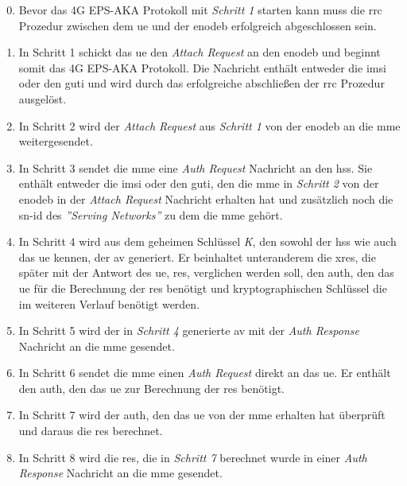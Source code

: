 \begin{enumerate}
\setcounter{enumi}{-1}
\item Bevor das 4G EPS-AKA Protokoll mit \textit{Schritt 1} starten kann muss die \gls{rrc} Prozedur zwischen dem \gls{ue} und der \gls{enodeb} erfolgreich abgeschlossen sein.

\item In Schritt 1 schickt das \gls{ue} den \textit{Attach Request} an den \gls{enodeb} und beginnt somit das 4G EPS-AKA Protokoll.
Die Nachricht enthält entweder die \gls{imsi} oder den \gls{guti} und wird durch das erfolgreiche abschließen der \gls{rrc} Prozedur ausgelöst.

\item In Schritt 2 wird der \textit{Attach Request} aus \textit{Schritt 1} von der \gls{enodeb} an die \gls{mme} weitergesendet.

\item In Schritt 3 sendet die \gls{mme} eine \textit{Auth Request} Nachricht an den \gls{hss}.
Sie enthält entweder die \gls{imsi} oder den \gls{guti}, den die \gls{mme} in \textit{Schritt 2} von der \gls{enodeb} in der \textit{Attach Request} Nachricht erhalten hat und zusätzlich noch die \gls{sn-id} des \textit{''Serving Networks''} zu dem die \gls{mme} gehört.

\item In Schritt 4 wird aus dem geheimen Schlüssel \textit{K}, den sowohl der \gls{hss} wie auch das \gls{ue} kennen, der \gls{av} generiert.
Er beinhaltet unteranderem die \gls{xres}, die später mit der Antwort des \gls{ue}, \gls{res}, verglichen werden soll, den \gls{auth}, den das \gls{ue} für die Berechnung der \gls{res} benötigt und kryptographischen Schlüssel die im weiteren Verlauf benötigt werden.

\item In Schritt 5 wird der in \textit{Schritt 4} generierte \gls{av} mit der \textit{Auth Response} Nachricht an die \gls{mme} gesendet.

\item In Schritt 6 sendet die \gls{mme} einen \textit{Auth Request} direkt an das \gls{ue}.
Er enthält den \gls{auth}, den das \gls{ue} zur Berechnung der \gls{res} benötigt.

\item In Schritt 7 wird der \gls{auth}, den das \gls{ue} von der \gls{mme} erhalten hat überprüft und daraus die \gls{res} berechnet.

\item In Schritt 8 wird die \gls{res}, die in \textit{Schritt 7} berechnet wurde in einer \textit{Auth Response} Nachricht an die \gls{mme} gesendet.


\end{enumerate}

